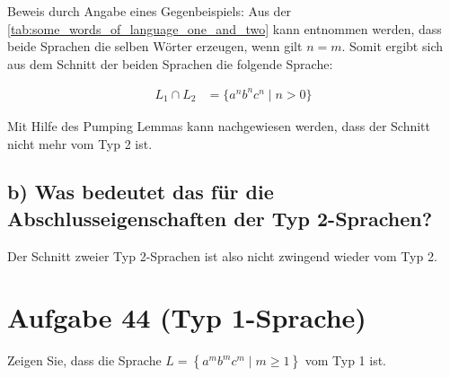 \documentclass{article}
\begin{document}
Beweis durch Angabe eines Gegenbeispiels: Aus der \autoref{tab:some_words_of_language_one_and_two} kann entnommen werden, dass beide Sprachen die selben Wörter erzeugen, wenn gilt $n=m$. Somit ergibt sich aus dem Schnitt der beiden Sprachen die folgende Sprache:

\begin{align}
L_1 \cap L_2 &= \{a^n b^n c^n \mid n > 0\} \nonumber
\end{align}

Mit Hilfe des Pumping Lemmas kann nachgewiesen werden, dass der Schnitt nicht mehr vom Typ 2 ist.

\subsection*{b) Was bedeutet das für die Abschlusseigenschaften der Typ 2-Sprachen?}

Der Schnitt zweier Typ 2-Sprachen ist also nicht zwingend wieder vom Typ 2.


\section*{Aufgabe 44 (Typ 1-Sprache)}

Zeigen Sie, dass die Sprache $L = \left\{a^m b^m c^m \mid m \geq 1\right\}$ vom Typ 1 ist.
\end{document}
